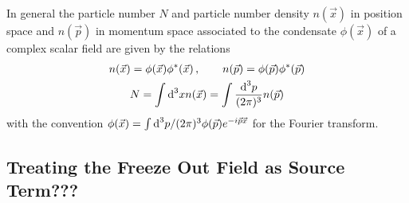 In general the particle number $N$ and particle number density $n(\vec{x})$ in position space and $n(\vec{p})$ in momentum space associated to the condensate $\phi(\vec{x})$ of a complex scalar field are given by the relations
\begin{subequations}
    \begin{gather}
        n(\vec{x})=\phi(\vec{x})\phi^*(\vec{x})\,,\qquad n(\vec{p})=\phi(\vec{p})\phi^*(\vec{p})\\
        N=\int\text{d}^3xn(\vec{x})=\int\frac{\text{d}^3p}{(2\pi)^3}n(\vec{p})
    \end{gather}
\end{subequations}
with the convention $\phi(\vec{x})=\int\text{d}^3p/(2\pi)^3\phi(\vec{p})e^{-{i}\vec{p}\vec{x}}$ for the Fourier transform.



% 

\subsection{Treating the Freeze Out Field as Source Term???}

